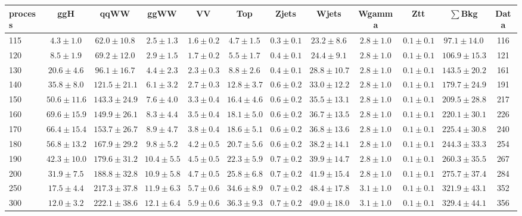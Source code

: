 \begin{table}
{\tiny
 \begin{center}
 \begin{tabular}{l c c c c c c c c c c c }
 \hline
 process & ggH & qqWW & ggWW & VV & Top & Zjets & Wjets & Wgamma & Ztt & $\sum$Bkg & Data \\
 \hline
115 & $4.3\pm1.0$ & $62.0\pm10.8$ & $2.5\pm1.3$ & $1.6\pm0.2$ & $4.7\pm1.5$ & $0.3\pm0.1$ & $23.2\pm8.6$ & $2.8\pm1.0$ & $0.1\pm0.1$ & $97.1\pm14.0$ & 116 \\
120 & $8.5\pm1.9$ & $69.2\pm12.0$ & $2.9\pm1.5$ & $1.7\pm0.2$ & $5.5\pm1.7$ & $0.4\pm0.1$ & $24.4\pm9.1$ & $2.8\pm1.0$ & $0.1\pm0.1$ & $106.9\pm15.3$ & 121 \\
130 & $20.6\pm4.6$ & $96.1\pm16.7$ & $4.4\pm2.3$ & $2.3\pm0.3$ & $8.8\pm2.6$ & $0.4\pm0.1$ & $28.8\pm10.7$ & $2.8\pm1.0$ & $0.1\pm0.1$ & $143.5\pm20.2$ & 161 \\
140 & $35.8\pm8.0$ & $121.5\pm21.1$ & $6.1\pm3.2$ & $2.7\pm0.3$ & $12.8\pm3.7$ & $0.6\pm0.2$ & $33.0\pm12.2$ & $2.8\pm1.0$ & $0.1\pm0.1$ & $179.7\pm24.9$ & 191 \\
150 & $50.6\pm11.6$ & $143.3\pm24.9$ & $7.6\pm4.0$ & $3.3\pm0.4$ & $16.4\pm4.6$ & $0.6\pm0.2$ & $35.5\pm13.1$ & $2.8\pm1.0$ & $0.1\pm0.1$ & $209.5\pm28.8$ & 217 \\
160 & $69.6\pm15.9$ & $149.9\pm26.1$ & $8.3\pm4.4$ & $3.5\pm0.4$ & $18.1\pm5.0$ & $0.6\pm0.2$ & $36.7\pm13.5$ & $2.8\pm1.0$ & $0.1\pm0.1$ & $220.1\pm30.1$ & 226 \\
170 & $66.4\pm15.4$ & $153.7\pm26.7$ & $8.9\pm4.7$ & $3.8\pm0.4$ & $18.6\pm5.1$ & $0.6\pm0.2$ & $36.8\pm13.6$ & $2.8\pm1.0$ & $0.1\pm0.1$ & $225.4\pm30.8$ & 240 \\
180 & $56.8\pm13.2$ & $167.9\pm29.2$ & $9.8\pm5.2$ & $4.2\pm0.5$ & $20.7\pm5.6$ & $0.6\pm0.2$ & $38.2\pm14.1$ & $2.8\pm1.0$ & $0.1\pm0.1$ & $244.3\pm33.3$ & 254 \\
190 & $42.3\pm10.0$ & $179.6\pm31.2$ & $10.4\pm5.5$ & $4.5\pm0.5$ & $22.3\pm5.9$ & $0.7\pm0.2$ & $39.9\pm14.7$ & $2.8\pm1.0$ & $0.1\pm0.1$ & $260.3\pm35.5$ & 267 \\
200 & $31.9\pm7.5$ & $188.8\pm32.8$ & $10.9\pm5.8$ & $4.7\pm0.5$ & $25.8\pm6.8$ & $0.7\pm0.2$ & $41.9\pm15.4$ & $2.8\pm1.0$ & $0.1\pm0.1$ & $275.7\pm37.4$ & 284 \\
250 & $17.5\pm4.4$ & $217.3\pm37.8$ & $11.9\pm6.3$ & $5.7\pm0.6$ & $34.6\pm8.9$ & $0.7\pm0.2$ & $48.4\pm17.8$ & $3.1\pm1.0$ & $0.1\pm0.1$ & $321.9\pm43.1$ & 352 \\
300 & $12.0\pm3.2$ & $222.1\pm38.6$ & $12.1\pm6.4$ & $5.9\pm0.6$ & $36.3\pm9.3$ & $0.7\pm0.2$ & $49.0\pm18.0$ & $3.1\pm1.0$ & $0.1\pm0.1$ & $329.4\pm44.1$ & 356 \\

\end{tabular}
\end{center}}
\end{table}

